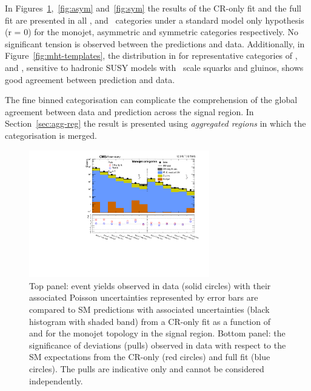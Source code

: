 In Figures~\ref{fig:mono},~\ref{fig:asym} and~\ref{fig:sym} the results of the CR-only fit and the full fit are presented in all \scalht, \njet 
and \nb~categories under a standard model only hypothesis (r = 0) for the monojet, asymmetric 
and symmetric categories respectively. No significant tension is observed between the predictions
and data. Additionally, in Figure~\ref{fig:mht-templates}, the distribution in \mht for representative 
categories of \scalht, \njet and \nb, sensitive to hadronic SUSY models with \TeV ~scale squarks and gluinos, 
shows good agreement between prediction and data.

The fine binned categorisation can complicate the comprehension of the global agreement between data and 
prediction across the signal region. In Section~\ref{sec:agg-reg} the result is presented using 
\emph{aggregated regions} in which the categorisation is merged. 

\begin{figure}[!h]
  \begin{center}
    \includegraphics[width=0.7\textwidth]{Figures/statisticalResults/summaryPlot_Monojet_prefit_overlay_fit_b}
    \caption{Top panel: event yields observed in data (solid circles) 
	with their associated Poisson uncertainties represented by error bars 
	are compared to SM predictions with associated uncertainties (black
      histogram with shaded band) from a CR-only fit as a function of
      \nb and \scalht for the monojet topology in the
      signal region. Bottom panel: the significance of deviations
      (pulls) observed in data with respect to the SM expectations
      from the CR-only (red circles) and full fit (blue circles). The
      pulls are indicative only and cannot be considered
      independently.}
    \label{fig:mono}
  \end{center}
\end{figure}

